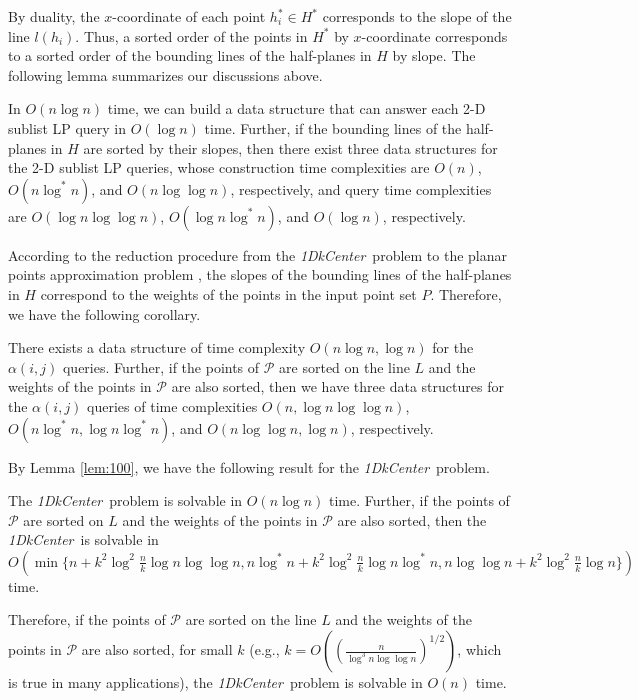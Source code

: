 \documentclass{llncs}
\def\calP{\mathcal{P}}
\def\problem{{\it 1DkCenter}}
\begin{document}
By duality, the $x$-coordinate of each point $h_i^*\in H^*$
corresponds to the slope of the line $l(h_i)$. Thus, a sorted
order of the points in $H^*$ by $x$-coordinate corresponds to a
sorted order of the bounding lines of the half-planes in $H$ by
slope. The following lemma summarizes our discussions above.

\begin{lemma}\label{lem:summary}
In $O(n\log n)$ time, we can build a data structure that can answer
each 2-D sublist LP query in $O(\log n)$ time. Further, if the
bounding lines of the half-planes in $H$ are sorted by their slopes,
then there exist three data structures for the 2-D sublist LP
queries, whose construction time complexities are $O(n)$,
$O(n\log^*n)$, and $O(n\log\log n)$, respectively, and query time
complexities are $O(\log n\log\log n)$, $O(\log n\log^*n)$, and
$O(\log n)$, respectively.
\end{lemma}

According to the reduction procedure from the \problem\ problem to the
planar points
approximation problem \cite{ref:ChenEfkCenter11}, the slopes of the
bounding lines of the half-planes in $H$ correspond to the weights
of the points in the input point set $P$. Therefore, we have the following
corollary.

\begin{corollary}
There exists a data structure of time complexity $O(n\log n, \log
n)$ for the $\alpha(i,j)$ queries. Further, if the points of $\calP$
are sorted on the line $L$ and the weights of the points in $\calP$
are also sorted, then we have three data structures for the
$\alpha(i,j)$ queries of time complexities $O(n,\log n\log\log n)$,
$O(n\log^*n,\log n\log^*n)$, and $O(n\log\log n, \log n)$,
respectively.
\end{corollary}

By Lemma \ref{lem:100}, we have the following result for the \problem\
problem.

\begin{theorem}\label{theo:continuous}
The \problem\ problem is solvable in $O(n\log n)$ time. Further, if
the points of $\calP$ are sorted on $L$ and the weights of the
points in $\calP$ are also sorted, then the \problem\ is solvable in
$O(\min\{n+k^2\log^2{\frac{n}{k}}\log n\log\log
n,n\log^*n+k^2\log^2{\frac{n}{k}}\log n\log^*n,n\log\log
n+k^2\log^2{\frac{n}{k}}\log n\})$ time.
\end{theorem}

Therefore, if the points of $\calP$ are sorted on the line $L$ and
the weights of the points in $\calP$ are also sorted, for small $k$
(e.g., $k=O((\frac{n}{\log^3n\log\log n})^{1/2})$, which is true in
many applications), the \problem\
problem is solvable in $O(n)$ time.
\end{document}
